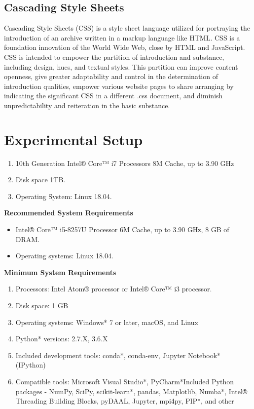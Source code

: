 \documentclass[oneside,12pt]{Classes/VTU}
\begin{document}
	\subsection{Cascading Style Sheets}
	Cascading Style Sheets (CSS) is a style sheet language utilized for portraying the introduction of an archive written in a markup language like HTML. CSS is a foundation innovation of the World Wide Web, close by HTML and JavaScript. CSS is intended to empower the partition of introduction and substance, including design, hues, and textual styles. This partition can improve content openness, give greater adaptability and control in the determination of introduction qualities, empower various website pages to share arranging by indicating the significant CSS in a different .css document, and diminish unpredictability and reiteration in the basic substance.
	
	\section{Experimental Setup}
	\begin{enumerate}
		\item 10th Generation Intel® Core™ i7 Processors 8M Cache, up to 3.90 GHz
		\item Disk space 1TB.
		\item Operating System: Linux 18.04. 
	\end{enumerate}
	
	\textbf{Recommended System Requirements}  
	
	\begin{itemize}
		\item Intel® Core™ i5-8257U Processor 6M Cache, up to 3.90 GHz, 8 GB of DRAM. 
		\item Operating systems:  Linux 18.04.
	\end{itemize}
	
	\textbf{Minimum System Requirements}
	
	\begin{enumerate}
		\item Processors: Intel Atom® processor or Intel® Core™ i3 processor.
		\item Disk space: 1 GB 
		\item Operating systems: Windows* 7 or later, macOS, and Linux 
		\item Python* versions: 2.7.X, 3.6.X 
		\item Included development tools: conda*, conda-env, Jupyter Notebook* (IPython) 
		\item Compatible tools: Microsoft Visual Studio*, PyCharm*Included Python packages - NumPy, SciPy, scikit-learn*, pandas, Matplotlib, Numba*, Intel® Threading Building Blocks, pyDAAL, Jupyter, mpi4py, PIP*, and other 
	\end{enumerate}
\end{document}
